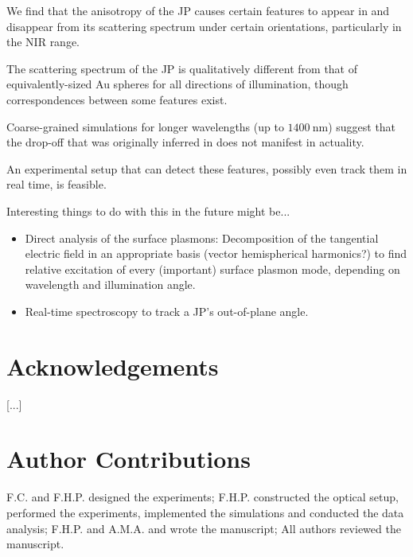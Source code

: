 \documentclass[10pt]{article}
\begin{document}
We find that the anisotropy of the JP causes certain features to appear in and disappear from its scattering spectrum under certain orientations, particularly in the NIR range. 

The scattering spectrum of the JP is qualitatively different from that of equivalently-sized Au spheres for all directions of illumination, though correspondences between some features exist.   

Coarse-grained simulations for longer wavelengths (up to $\SI{1400}{\nano\meter}$) suggest that the drop-off that was originally inferred in \cite*{MA} does not manifest in actuality. 

An experimental setup that can detect these features, possibly even track them in real time, is feasible.

Interesting things to do with this in the future might be...
\begin{itemize}
    \item Direct analysis of the surface plasmons: 
    Decomposition of the tangential electric field in an appropriate basis (vector hemispherical harmonics?) to find relative excitation of every (important) surface plasmon mode, depending on wavelength and illumination angle.
    \item Real-time spectroscopy to track a JP's out-of-plane angle. 
\end{itemize}







\printbibliography

\section*{Acknowledgements}
[...]

\section*{Author Contributions}
F.C. and F.H.P. designed the experiments; 
F.H.P. constructed the optical setup, performed the experiments, implemented the simulations and conducted the data analysis; 
F.H.P. and A.M.A. and wrote the manuscript; 
All authors reviewed the manuscript.
\end{document}
